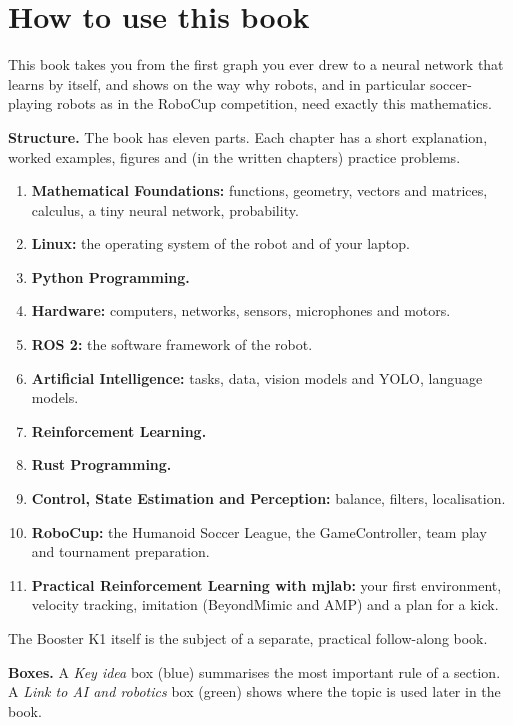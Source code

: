 \documentclass[11pt,a4paper,twoside]{book}
\begin{document}
\frontmatter
\makebooktitle
\cleardoublepage
\tableofcontents

\chapter*{How to use this book}

This book takes you from the first graph you ever drew to a neural network that learns by itself, and shows on the way why robots, and in particular soccer-playing robots as in the RoboCup competition, need exactly this mathematics.

\textbf{Structure.} The book has eleven parts. Each chapter has a short explanation, worked examples, figures and (in the written chapters) practice problems.
\begin{enumerate}[nosep,label=\textbf{Part~\Roman*:},leftmargin=4.2em]
  \item \textbf{Mathematical Foundations:} functions, geometry, vectors and matrices, calculus, a tiny neural network, probability.
  \item \textbf{Linux:} the operating system of the robot and of your laptop.
  \item \textbf{Python Programming.}
  \item \textbf{Hardware:} computers, networks, sensors, microphones and motors.
  \item \textbf{ROS 2:} the software framework of the robot.
  \item \textbf{Artificial Intelligence:} tasks, data, vision models and YOLO, language models.
  \item \textbf{Reinforcement Learning.}
  \item \textbf{Rust Programming.}
  \item \textbf{Control, State Estimation and Perception:} balance, filters, localisation.
  \item \textbf{RoboCup:} the Humanoid Soccer League, the GameController, team play and tournament preparation.
  \item \textbf{Practical Reinforcement Learning with mjlab:} your first environment, velocity tracking, imitation (BeyondMimic and AMP) and a plan for a kick.
\end{enumerate}

The Booster K1 itself is the subject of a separate, practical follow-along book.

\textbf{Boxes.} A \emph{Key idea} box (blue) summarises the most important rule of a section. A \emph{Link to AI and robotics} box (green) shows where the topic is used later in the book.
\end{document}
